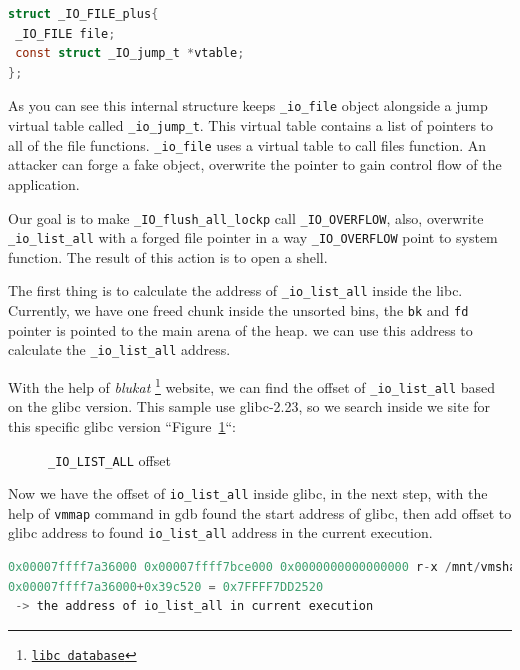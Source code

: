 \documentclass{masterthesis}
\newcommand*\libc{glibc}
\newcommand*\ub{unsorted bins}
\begin{document}
\begin{lstlisting}[language=c,frame=tlrb]
struct _IO_FILE_plus{
 _IO_FILE file;
 const struct _IO_jump_t *vtable;
};
\end{lstlisting}

As you can see this internal structure keeps \lstinline{_io_file} object alongside a jump virtual table called \lstinline{_io_jump_t}. This virtual table contains a list of pointers to all of the file functions. \lstinline{_io_file} uses a virtual table to call files function. An attacker can forge a fake object, overwrite the pointer to gain control flow of the application.

Our goal is to make \lstinline{_IO_flush_all_lockp} call \lstinline{_IO_OVERFLOW}, also, overwrite \lstinline{_io_list_all} with a forged file pointer in a way \lstinline{_IO_OVERFLOW} point to system function. The result of this action is to open a shell.

The first thing is to calculate the address of \lstinline{_io_list_all} inside the libc. Currently, we have one freed chunk inside the \ub{}, the \lstinline{bk} and \lstinline{fd} pointer is pointed to the main arena of the heap. we can use this address to calculate the \lstinline{_io_list_all} address.

With the help of \emph{blukat} \footnote{\href{https://libc.blukat.me}{\texttt{libc database}}} website, we can find the offset of \lstinline{_io_list_all} based on the \libc{} version. This sample use \libc{-2.23}, so we search inside we site for this specific \libc{} version ``Figure~\ref{fig:offset}``:

\begin{figure}[h!]
 \caption{\lstinline{_IO_LIST_ALL} offset}
 \label{fig:offset}
\end{figure}


Now we have the offset of \lstinline{io_list_all} inside \libc{}, in the next step, with the help of \lstinline{vmmap} command in gdb found the start address of \libc{}, then add offset to \libc{} address to found \lstinline{io_list_all} address in the current execution.
\begin{lstlisting}[language=c,frame=tlrb]
0x00007ffff7a36000 0x00007ffff7bce000 0x0000000000000000 r-x /mnt/vmshare/MasterThesis/libc223/libc.so.6
0x00007ffff7a36000+0x39c520 = 0x7FFFF7DD2520
 -> the address of io_list_all in current execution
\end{lstlisting}
\end{document}

